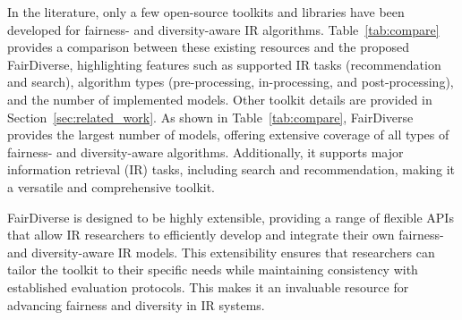 \documentclass[sigconf]{acmart}
\begin{document}
In the literature, only a few open-source toolkits and libraries have been developed for fairness- and diversity-aware IR algorithms. Table~\ref{tab:compare} provides a comparison between these existing resources and the proposed FairDiverse, highlighting features such as supported IR tasks (recommendation and search), algorithm types (pre-processing, in-processing, and post-processing), and the number of implemented models. Other toolkit details are provided in Section~\ref{sec:related_work}. As shown in Table~\ref{tab:compare}, FairDiverse provides the largest number of models, offering extensive coverage of all types of fairness- and diversity-aware algorithms. Additionally, it supports major information retrieval (IR) tasks, including search and recommendation, making it a versatile and comprehensive toolkit.

FairDiverse is designed to be highly extensible, providing a range of flexible APIs that allow IR researchers to efficiently develop and integrate their own fairness- and diversity-aware IR models. This extensibility ensures that researchers can tailor the toolkit to their specific needs while maintaining consistency with established evaluation protocols. This makes it an invaluable resource for advancing fairness and diversity in IR systems.

%








\newpage


\end{document}
